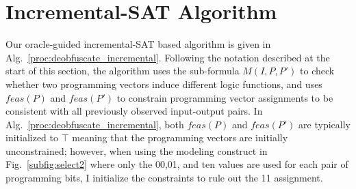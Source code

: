 \documentclass[thesis]{umassthesis}  %
\begin{document}

















\section{Incremental-SAT Algorithm}

Our oracle-guided incremental-SAT based algorithm is given in Alg.~\ref{proc:deobfuscate_incremental}. Following the notation described at the start of this section, the algorithm uses the sub-formula $M(I,P,P')$ to check whether two programming vectors induce different logic functions, and uses $feas(P)$ and $feas(P')$ to constrain programming vector assignments to be consistent with all previously observed input-output pairs. {In Alg.~\ref{proc:deobfuscate_incremental}, both $feas(P)$ and $feas(P')$ are typically initialized to $\top$ meaning that the programming vectors are initially unconstrained; however, when using the modeling construct in Fig.~\ref{subfig:select2} where only the 00,01, and ten values are used for each pair of programming bits, I initialize the constraints to rule out the 11 assignment.}
\end{document}
